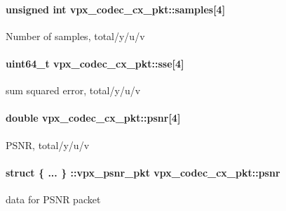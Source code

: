 \paragraph[{\texorpdfstring{samples}{samples}}]{\setlength{\rightskip}{0pt plus 5cm}unsigned int vpx\+\_\+codec\+\_\+cx\+\_\+pkt\+::samples\mbox{[}4\mbox{]}}\hypertarget{structvpx__codec__cx__pkt_a4d3fc7eb2d19c5913c6f3f474e5cf77b}{}\label{structvpx__codec__cx__pkt_a4d3fc7eb2d19c5913c6f3f474e5cf77b}
Number of samples, total/y/u/v 
\paragraph[{\texorpdfstring{sse}{sse}}]{\setlength{\rightskip}{0pt plus 5cm}uint64\+\_\+t vpx\+\_\+codec\+\_\+cx\+\_\+pkt\+::sse\mbox{[}4\mbox{]}}\hypertarget{structvpx__codec__cx__pkt_ad65e918d3f26743cc7a8898b88bcb397}{}\label{structvpx__codec__cx__pkt_ad65e918d3f26743cc7a8898b88bcb397}
sum squared error, total/y/u/v 
\paragraph[{\texorpdfstring{psnr}{psnr}}]{\setlength{\rightskip}{0pt plus 5cm}double vpx\+\_\+codec\+\_\+cx\+\_\+pkt\+::psnr\mbox{[}4\mbox{]}}\hypertarget{structvpx__codec__cx__pkt_a63744aeceb50355d6402d55309c151b6}{}\label{structvpx__codec__cx__pkt_a63744aeceb50355d6402d55309c151b6}
P\+S\+NR, total/y/u/v 
\paragraph[{\texorpdfstring{psnr}{psnr}}]{\setlength{\rightskip}{0pt plus 5cm}struct \{ ... \} \+::vpx\+\_\+psnr\+\_\+pkt  vpx\+\_\+codec\+\_\+cx\+\_\+pkt\+::psnr}\hypertarget{structvpx__codec__cx__pkt_ac91dc0ee23d3d939b85eb82eb5ccc042}{}\label{structvpx__codec__cx__pkt_ac91dc0ee23d3d939b85eb82eb5ccc042}
data for P\+S\+NR packet 

